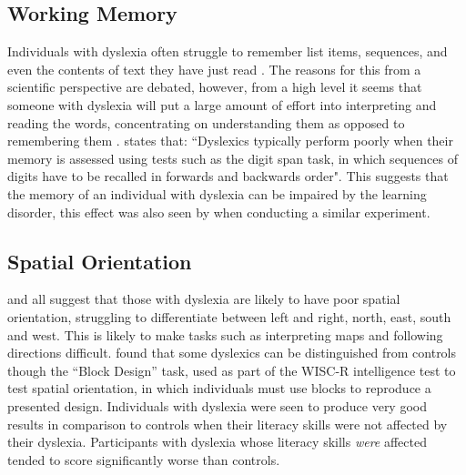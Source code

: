 \documentclass[journal]{IEEEtran}
\begin{document}
\subsection{Working Memory}
\label{sec:memory}
Individuals with dyslexia often struggle to remember list items, sequences, and even the contents of text they have just read \cite{snowling}. The reasons for this from a scientific perspective are debated, however, from a high level it seems that someone with dyslexia will put a large amount of effort into interpreting and reading the words, concentrating on understanding them as opposed to remembering them \cite{neurobiological}.
\cite{snowling} states that: ``Dyslexics typically perform poorly when their memory is assessed using tests such as the digit span task, in which sequences of digits have to be recalled in forwards and backwards order". This suggests that the memory of an individual with dyslexia can be impaired by the learning disorder, this effect was also seen by \cite{memory1980} when conducting a similar experiment. 

\subsection{Spatial Orientation}
\label{sec:spatial}
\cite{bartlett, tosee} and \cite{DetectAndManage}  all suggest that those with dyslexia are likely to have poor spatial orientation, struggling to differentiate between left and right, north, east, south and west. This is likely to make tasks such as interpreting maps and following directions difficult. 
\cite{sequential} found that some dyslexics can be distinguished from controls though the ``Block Design'' task, used as part of the WISC-R intelligence test to test spatial orientation\cite{wisc}, in which individuals must use blocks to reproduce a presented design. Individuals with dyslexia were seen to produce very good results in comparison to controls when their literacy skills were not affected by their dyslexia. Participants with dyslexia whose literacy skills \emph{were} affected tended to score significantly worse than controls.
\end{document}
